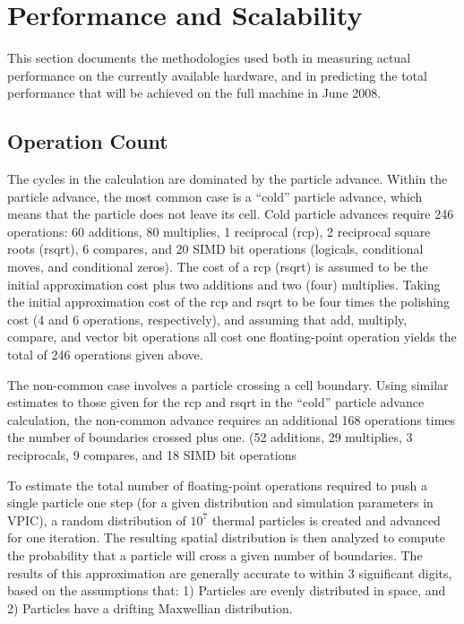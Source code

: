 \documentclass[letter,10pt]{article}
\begin{document}
\section*{Performance and Scalability} \label{sec:performance}

This section documents the methodologies used both in measuring actual
performance on the currently available hardware, and in predicting the
total performance that will be achieved on the full machine in June
2008.

\subsection{Operation Count}

The cycles in the calculation are dominated by the particle advance.
Within the particle advance, the most common case is a ``cold''
particle advance, which means that the particle does not leave its
cell.  Cold particle advances require 246 operations: 60 additions, 80
multiplies, 1 reciprocal (rcp), 2 reciprocal square roots (rsqrt), 6
compares, and 20 SIMD bit operations (logicals, conditional moves, and
conditional zeros).  The cost of a rcp (rsqrt) is assumed to be the
initial approximation cost plus two additions and two (four)
multiplies.  Taking the initial approximation cost of the rcp and
rsqrt to be four times the polishing cost (4 and 6 operations,
respectively), and assuming that add, multiply, compare, and vector
bit operations all cost one floating-point operation yields the total
of 246 operations given above.

The non-common case involves a particle crossing a cell boundary.
Using similar estimates to those given for the rcp and rsqrt in the
``cold'' particle advance calculation, the non-common advance requires
an additional 168 operations times the number of boundaries crossed
plus one.  (52 additions, 29 multiplies, 3 reciprocals, 9 compares,
and 18 SIMD bit operations

To estimate the total number of floating-point operations required to
push a single particle one step (for a given distribution and
simulation parameters in VPIC), a random distribution of $10^7$
thermal particles is created and advanced for one iteration.  The
resulting spatial distribution is then analyzed to compute the
probability that a particle will cross a given number of boundaries.
The results of this approximation are generally accurate to within 3
significant digits, based on the assumptions that: 1) Particles are
evenly distributed in space, and 2) Particles have a drifting
Maxwellian distribution.
\end{document}
